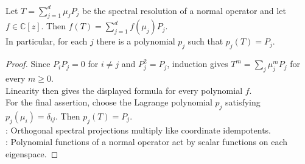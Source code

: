 \begin{corollary} \label{cor:normal-spectral-resolution-functional-calculus} \\
Let $T=\sum_{j=1}^{d}\mu_jP_j$ be the spectral resolution of a normal operator and let $f\in\mathbb{C}[z]$. Then $f(T)=\sum\limits_{j=1}^{d}f(\mu_j)P_j$.\\
In particular, for each $j$ there is a polynomial $p_j$ such that $p_j(T)=P_j$.
\begin{proof}
Since $P_iP_j=0$ for $i\neq j$ and $P_j^2=P_j$, induction gives $T^m=\sum_j\mu_j^mP_j$ for every $m\geq0$.\\
Linearity then gives the displayed formula for every polynomial $f$.\\
For the final assertion, choose the Lagrange polynomial $p_j$ satisfying $p_j(\mu_i)=\delta_{ij}$. Then $p_j(T)=P_j$.\\
: Orthogonal spectral projections multiply like coordinate idempotents.\\
: Polynomial functions of a normal operator act by scalar functions on each eigenspace.
\end{proof}
\end{corollary}
